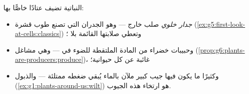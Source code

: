 \begin{proposition}\label{prop:g6:cell-unit-of-life:plantextras}
 النباتية تضيف عتادًا خاصًّا بها:
\begin{itemize}
  \item \emph{جدار خلوي} صلب خارج  ---
        وهو الجدران التي تصنع طوب قشرة 
        (\cref{ex:g5:first-look-at-cells:classics}) وتعطي
         صلابتها القائمة بلا ؛
  \item وحبيبات خضراء من المادة الملتقطة للضوء في  ---
        وهي مشاغل 
        (\cref{prop:g6:plants-are-producers:produce})، غائبة عن
        كل  حيوانية؛
  \item وكثيرًا ما يكون فيها جيب كبير ملآن بالماء يُبقي ضغطه
         ممتلئة --- والذبول
        (\cref{ex:g1:plants-around-us:wilt}) هو ارتخاء هذه
        الجيوب.
\end{itemize}
\end{proposition}
\admitted

